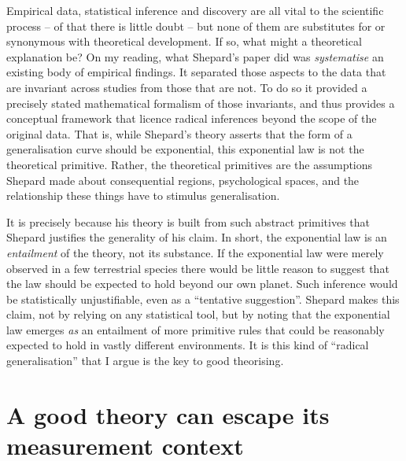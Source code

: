 \documentclass[english,doc]{apa6}
\begin{document}
Empirical data, statistical inference and discovery are all vital to the scientific process -- of that there is little doubt -- but none of them are substitutes for or synonymous with theoretical development. If so, what might a theoretical explanation be? On my reading, what Shepard's paper did was \emph{systematise} an existing body of empirical findings. It separated those aspects to the data that are invariant across studies from those that are not. To do so it provided a precisely stated mathematical formalism of those invariants, and thus provides a conceptual framework that licence radical inferences beyond the scope of the original data. That is, while Shepard's theory asserts that the form of a generalisation curve should be exponential, this exponential law is not the theoretical primitive. Rather, the theoretical primitives are the assumptions Shepard made about consequential regions, psychological spaces, and the relationship these things have to stimulus generalisation.

It is precisely because his theory is built from such abstract primitives that Shepard justifies the generality of his claim. In short, the exponential law is an \emph{entailment} of the theory, not its substance. If the exponential law were merely observed in a few terrestrial species there would be little reason to suggest that the law should be expected to hold beyond our own planet. Such inference would be statistically unjustifiable, even as a \enquote{tentative suggestion}. Shepard makes this claim, not by relying on any statistical tool, but by noting that the exponential law emerges \emph{as} an entailment of more primitive rules that could be reasonably expected to hold in vastly different environments. It is this kind of \enquote{radical generalisation} that I argue is the key to good theorising.

\hypertarget{a-good-theory-can-escape-its-measurement-context}{%
\section{A good theory can escape its measurement context}\label{a-good-theory-can-escape-its-measurement-context}}
\end{document}
